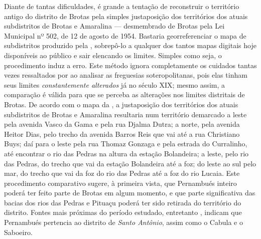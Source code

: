 Diante de tantas dificuldades, é grande a tentação de reconstruir o território antigo do distrito de Brotas pela simples justaposição dos territórios dos atuais subdistritos de Brotas e Amaralina --- desmembrado de Brotas pela Lei Municipal nº 502, de 12 de agosto de 1954. Bastaria georreferenciar o mapa de subdistritos produzido pela , sobrepô-lo a qualquer dos tantos mapas digitais hoje disponíveis ao público e sair elencando os limites. Simples como seja, o procedimento induz a erro. Este método ignora completamente os cuidados tantas vezes ressaltados por  ao analisar as freguesias soteropolitanas, pois elas tinham seus limites \textit{constantemente alterados} já no século XIX; mesmo assim, a comparação é válida para que se perceba as alterações nos limites distritais de Brotas. De acordo com o mapa da , a justaposição dos territórios dos atuais subdistritos de Brotas e Amaralina resultaria num território demarcado a leste pela avenida Vasco da Gama e pela rua Djalma Dutra; a norte, pela avenida Heitor Dias, pelo trecho da avenida Barros Reis que vai até a rua Christiano Buys; daí para o leste pela rua Thomaz Gonzaga e pela estrada do Curralinho, até encontrar o rio das Pedras na altura da estação Bolandeira; a leste, pelo rio das Pedras, do trecho que vai da estação Bolandeira até a foz; do leste ao sul pelo mar, do trecho que vai da foz do rio das Pedras até a foz do rio Lucaia. Este procedimento comparativo sugere, à primeira vista, que Pernambués inteiro poderá ter feito parte de Brotas em algum momento, e que parte significativa das bacias dos rios das Pedras e Pituaçu poderá ter sido retirada do território do distrito. Fontes mais próximas do período estudado, entretanto \cite{souza_guia_1935}, indicam que Pernambués pertencia ao distrito de \textit{Santo Antônio}, assim como o Cabula e o Saboeiro.